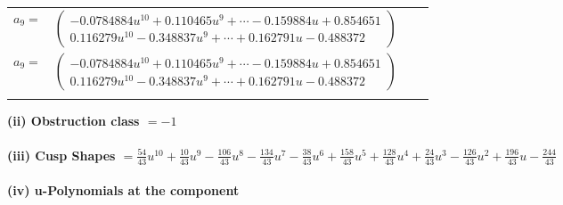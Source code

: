 \documentclass[1p]{elsarticle_modified}
\theoremstyle{definition}
\begin{document}
\begin{tabular}{m{7pt} m{180pt} m{7pt} m{180pt} }
\flushright $a_{9}=$&$\begin{pmatrix}-0.0784884 u^{10}+0.110465 u^{9}+\cdots-0.159884 u+0.854651\\0.116279 u^{10}-0.348837 u^{9}+\cdots+0.162791 u-0.488372\end{pmatrix}$\\ \flushright $a_{9}=$&$\begin{pmatrix}-0.0784884 u^{10}+0.110465 u^{9}+\cdots-0.159884 u+0.854651\\0.116279 u^{10}-0.348837 u^{9}+\cdots+0.162791 u-0.488372\end{pmatrix}$\\&\end{tabular}
\flushleft \textbf{(ii) Obstruction class $= -1$}\\~\\
\flushleft \textbf{(iii) Cusp Shapes $= \frac{54}{43} u^{10}+\frac{10}{43} u^9-\frac{106}{43} u^8-\frac{134}{43} u^7-\frac{38}{43} u^6+\frac{158}{43} u^5+\frac{128}{43} u^4+\frac{24}{43} u^3-\frac{126}{43} u^2+\frac{196}{43} u-\frac{244}{43}$}\\~\\
\newpage\renewcommand{\arraystretch}{1}
\flushleft \textbf{(iv) u-Polynomials at the component}\newline \\
\end{document}
